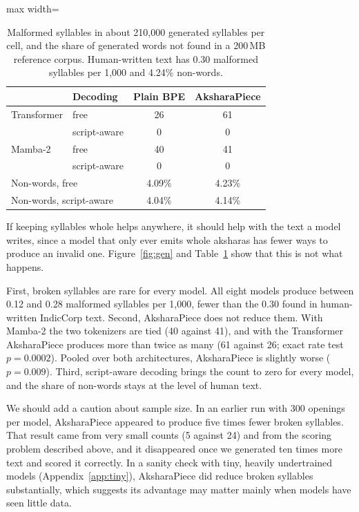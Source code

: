 \documentclass[11pt]{article}
\newcommand{\ap}{AksharaPiece}
\begin{document}
\begin{table}[t]
  \centering
  \small
  \begin{adjustbox}{max width=\columnwidth}
  \begin{tabular}{llcc}
    \toprule
    & Decoding & Plain BPE & \ap{} \\
    \midrule
    Transformer & free        & 26 & 61 \\
                & script-aware & 0  & 0  \\
    Mamba-2     & free        & 40 & 41 \\
                & script-aware & 0  & 0  \\
    \midrule
    \multicolumn{2}{l}{Non-words, free}         & 4.09\% & 4.23\% \\
    \multicolumn{2}{l}{Non-words, script-aware} & 4.04\% & 4.14\% \\
    \bottomrule
  \end{tabular}
  \end{adjustbox}
  \caption{Malformed syllables in about 210,000 generated syllables per cell, and the share of generated words not found in a 200\,MB reference corpus. Human-written text has 0.30 malformed syllables per 1,000 and 4.24\% non-words.}
  \label{tab:gen}
\end{table}

If keeping syllables whole helps anywhere, it should help with the text a model writes, since a model that only ever emits whole aksharas has fewer ways to produce an invalid one. Figure~\ref{fig:gen} and Table~\ref{tab:gen} show that this is not what happens.

First, broken syllables are rare for every model. All eight models produce between 0.12 and 0.28 malformed syllables per 1,000, fewer than the 0.30 found in human-written IndicCorp text. Second, \ap{} does not reduce them. With Mamba-2 the two tokenizers are tied (40 against 41), and with the Transformer \ap{} produces more than twice as many (61 against 26; exact rate test $p=0.0002$). Pooled over both architectures, \ap{} is slightly worse ($p=0.009$). Third, script-aware decoding brings the count to zero for every model, and the share of non-words stays at the level of human text.

We should add a caution about sample size. In an earlier run with 300 openings per model, \ap{} appeared to produce five times fewer broken syllables. That result came from very small counts (5 against 24) and from the scoring problem described above, and it disappeared once we generated ten times more text and scored it correctly. In a sanity check with tiny, heavily undertrained models (Appendix~\ref{app:tiny}), \ap{} did reduce broken syllables substantially, which suggests its advantage may matter mainly when models have seen little data.
\end{document}
